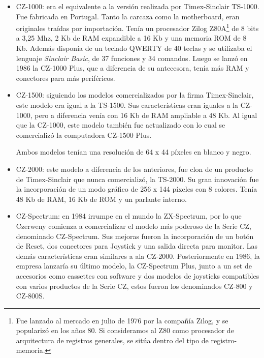 \documentclass[%
 	final,
%
	notitlepage,
	narroweqnarray,
	inline,
 	twoside,
	]{ieee}
\begin{document}
\begin{itemize}

\item CZ-1000: era el equivalente a la versi\'on realizada por Timex-Sinclair TS-1000. Fue fabricada en Portugal. Tanto la carcaza como la motherboard, eran originales tra\'idas por importaci\'on. Ten\'ia un procesador Zilog Z80A\footnote{Fue lanzado al mercado en julio de 1976 por la compa\~n\'ia Zilog, y se populariz\'o en los a\~nos 80. Si consideramos al Z80 como procesador de arquitectura de registros generales, se sitúa dentro del tipo de registro-memoria.\cite{z80}} de 8 bits a 3,25 Mhz, 2 Kb de RAM expandible a 16 Kb y una memoria ROM de 8 Kb. Adem\'as dispon\'ia de un teclado QWERTY de 40 teclas y se utilizaba el lenguaje \textit{Sinclair Basic}, de 37 funciones y 34 comandos.
Luego se lanz\'o en 1986 la CZ-1000 Plus, que a diferencia de su antecesora, ten\'ia m\'as RAM y conectores para m\'as perif\'ericos.\\


\item CZ-1500: siguiendo los modelos comercializados por la firma Timex-Sinclair, este modelo era igual a la TS-1500. Sus caracter\'isticas eran iguales a la CZ-1000, pero a diferencia ven\'ia con 16 Kb de RAM ampliable a 48 Kb.
Al igual que la CZ-1000, este modelo tambi\'en fue actualizado con lo cual se comercializ\'o la computadora CZ-1500 Plus.

Ambos modelos ten\'ian una resoluci\'on de 64 x 44 p\'ixeles en blanco y negro.\\

\item CZ-2000: este modelo a diferencia de los anteriores, fue clon de un producto de Timex-Sinclair que nunca comercializ\'o, la TS-2000. Su gran innovaci\'on fue la incorporaci\'on de un modo gr\'afico de 256 x 144 p\'ixeles con 8 colores. Ten\'ia 48 Kb de RAM, 16 Kb de ROM y un parlante interno.\\

\item CZ-Spectrum: en 1984 irrumpe en el mundo la ZX-Spectrum, por lo que Czerweny comienza a comercializar el modelo m\'as poderoso de la Serie CZ, denominado CZ-Spectrum. Sus mejoras fueron la incorporaci\'on de un bot\'on de Reset, dos conectores para Joystick y una salida directa para monitor. Las dem\'as caracter\'isticas eran similares a ala CZ-2000.
Posteriormente en 1986, la empresa lanzar\'ia su \'ultimo modelo, la CZ-Spectrum Plus, junto a un set de accesorios como cassettes con software y dos modelos de joysticks compatibles con varios productos de la Serie CZ, estos fueron los denominados CZ-800 y CZ-800S.\\
\end{itemize}
\end{document}
